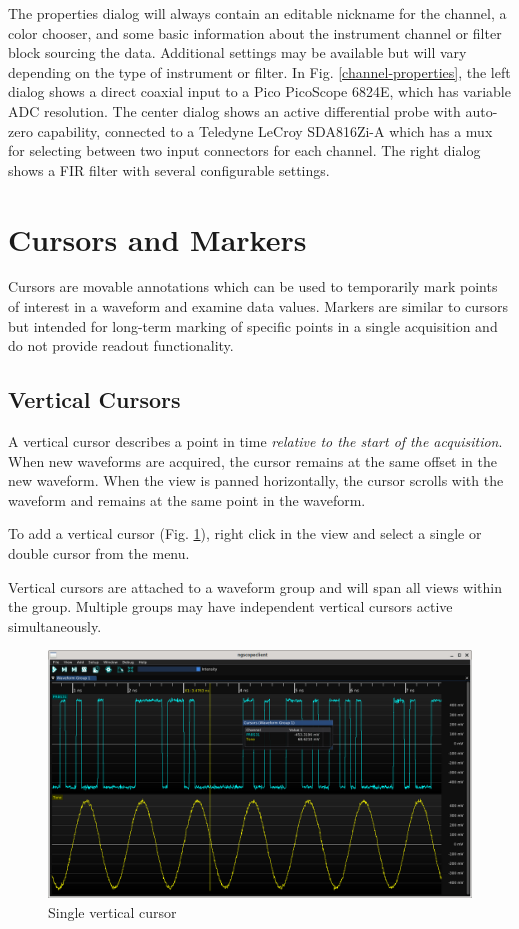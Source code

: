 The properties dialog will always contain an editable nickname for the channel, a color chooser, and some basic
information about the instrument channel or filter block sourcing the data. Additional settings may be available but
will vary depending on the type of instrument or filter. In Fig. \ref{channel-properties}, the left dialog shows a
direct coaxial input to a Pico PicoScope 6824E, which has variable ADC resolution. The center dialog shows an active
differential probe with auto-zero capability, connected to a Teledyne LeCroy SDA816Zi-A which has a mux for selecting
between two input connectors for each channel. The right dialog shows a FIR filter with several configurable settings.

\section{Cursors and Markers}
\label{sec:cursors}

Cursors are movable annotations which can be used to temporarily mark points of interest in a waveform and examine data
values. Markers are similar to cursors but intended for long-term marking of specific points in a single acquisition
and do not provide readout functionality.

\subsection{Vertical Cursors}

A vertical cursor describes a point in time \emph{relative to the start of the acquisition}. When new waveforms are
acquired, the cursor remains at the same offset in the new waveform. When the view is panned horizontally, the cursor
scrolls with the waveform and remains at the same point in the waveform.

To add a vertical cursor (Fig. \ref{vertical-cursor}), right click in the view and select a single or double cursor
from the  menu.

Vertical cursors are attached to a waveform group and will span all views within the group. Multiple groups may have
independent vertical cursors active simultaneously.

\begin{figure}[H]
\centering
\includegraphics[width=13cm]{ng-images/vertical-cursor.png}
\caption{Single vertical cursor}
\label{vertical-cursor}
\end{figure}

